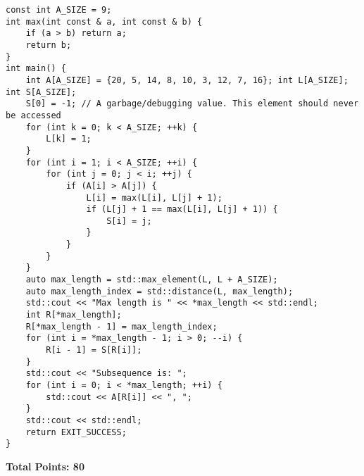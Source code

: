 \documentclass[11pt]{article}
\begin{document}
\begin{enumerate}
\begin{verbatim}
const int A_SIZE = 9;
int max(int const & a, int const & b) {
    if (a > b) return a;
    return b;
}
int main() {
    int A[A_SIZE] = {20, 5, 14, 8, 10, 3, 12, 7, 16}; int L[A_SIZE]; int S[A_SIZE];
    S[0] = -1; // A garbage/debugging value. This element should never be accessed
    for (int k = 0; k < A_SIZE; ++k) {
        L[k] = 1;
    }
    for (int i = 1; i < A_SIZE; ++i) {
        for (int j = 0; j < i; ++j) {
            if (A[i] > A[j]) {
                L[i] = max(L[i], L[j] + 1);
                if (L[j] + 1 == max(L[i], L[j] + 1)) {
                    S[i] = j;
                }
            }
        }
    }
    auto max_length = std::max_element(L, L + A_SIZE);
    auto max_length_index = std::distance(L, max_length);
    std::cout << "Max length is " << *max_length << std::endl;
    int R[*max_length];
    R[*max_length - 1] = max_length_index;
    for (int i = *max_length - 1; i > 0; --i) {
        R[i - 1] = S[R[i]];
    }
    std::cout << "Subsequence is: ";
    for (int i = 0; i < *max_length; ++i) {
        std::cout << A[R[i]] << ", ";
    }
    std::cout << std::endl;
    return EXIT_SUCCESS;
}
\end{verbatim}
\end{enumerate}


{\bf Total Points: 80}
\end{document}
